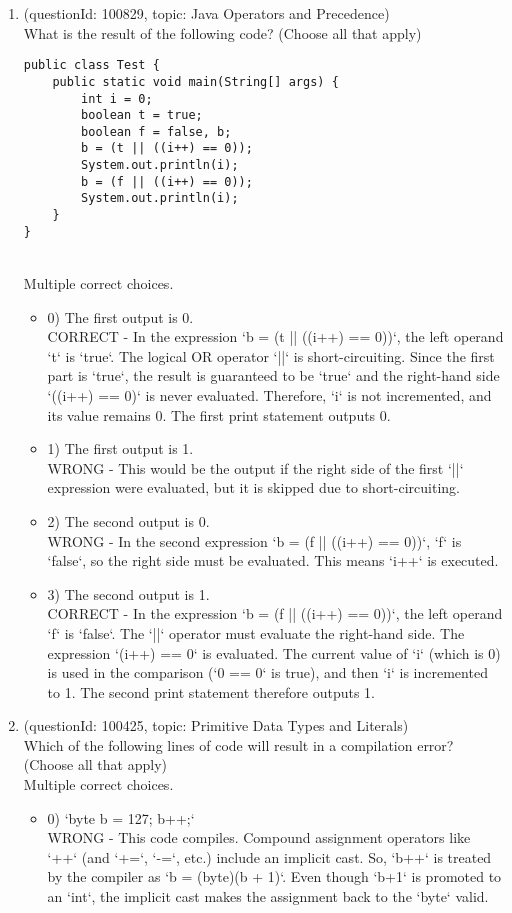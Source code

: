 \documentclass[12pt]{article}
\begin{document}
\begin{enumerate}[label=(\arabic*)]
\begin{itemize}
\end{itemize}
\item (questionId: 100829, topic: Java Operators and Precedence) \\ 
What is the result of the following code? (Choose all that apply)\n\begin{verbatim}
public class Test {
    public static void main(String[] args) {
        int i = 0;
        boolean t = true;
        boolean f = false, b;
        b = (t || ((i++) == 0));
        System.out.println(i);
        b = (f || ((i++) == 0));
        System.out.println(i);
    }
}
\end{verbatim}
\\ \noindent Multiple correct choices. 
\begin{itemize}
\item 0) The first output is 0.
 \\ 
CORRECT - In the expression `b = (t || ((i++) == 0))`, the left operand `t` is `true`. The logical OR operator `||` is short-circuiting. Since the first part is `true`, the result is guaranteed to be `true` and the right-hand side `((i++) == 0)` is never evaluated. Therefore, `i` is not incremented, and its value remains 0. The first print statement outputs 0.

\item 1) The first output is 1.
 \\ 
WRONG - This would be the output if the right side of the first `||` expression were evaluated, but it is skipped due to short-circuiting.

\item 2) The second output is 0.
 \\ 
WRONG - In the second expression `b = (f || ((i++) == 0))`, `f` is `false`, so the right side must be evaluated. This means `i++` is executed.

\item 3) The second output is 1.
 \\ 
CORRECT - In the expression `b = (f || ((i++) == 0))`, the left operand `f` is `false`. The `||` operator must evaluate the right-hand side. The expression `(i++) == 0` is evaluated. The current value of `i` (which is 0) is used in the comparison (`0 == 0` is true), and then `i` is incremented to 1. The second print statement therefore outputs 1.

\end{itemize}
\item (questionId: 100425, topic: Primitive Data Types and Literals) \\ 
Which of the following lines of code will result in a compilation error? (Choose all that apply)
\\ \noindent Multiple correct choices. 
\begin{itemize}
\item 0) `byte b = 127; b++;`
 \\ 
WRONG - This code compiles. Compound assignment operators like `++` (and `+=`, `-=`, etc.) include an implicit cast. So, `b++` is treated by the compiler as `b = (byte)(b + 1)`. Even though `b+1` is promoted to an `int`, the implicit cast makes the assignment back to the `byte` valid.


\end{itemize}
\end{enumerate}
\end{document}
